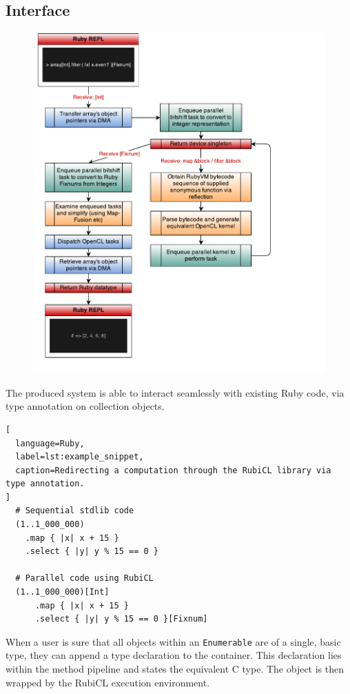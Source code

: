 \subsection{Interface}
\begin{figure}
\includegraphics[]{./figures/rubicl_workflow}
    \label{fig:rem}
\end{figure}

The produced system is able to interact seamlessly with existing Ruby code, via type annotation on collection objects.

\begin{lstlisting}[
  language=Ruby,
  label=lst:example_snippet,
  caption=Redirecting a computation through the RubiCL library via type annotation.
]
  # Sequential stdlib code
  (1..1_000_000)
    .map { |x| x + 15 }
    .select { |y| y % 15 == 0 }

  # Parallel code using RubiCL
  (1..1_000_000)[Int]
      .map { |x| x + 15 }
      .select { |y| y % 15 == 0 }[Fixnum]
\end{lstlisting}


When a user is sure that all objects within an \verb|Enumerable| are of a single, basic type, they can append a type declaration to the container. This declaration lies within the method pipeline and states the equivalent C type. The object is then wrapped by the RubiCL execution environment.

